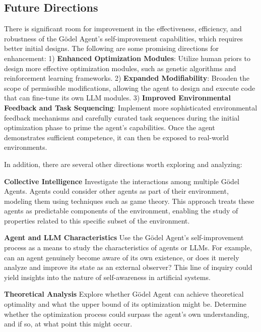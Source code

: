 \documentclass[11pt]{article}
\newcommand{\godel}{G\"odel\xspace}
\newcommand{\framework}{Gödel Agent\xspace}
\begin{document}
\subsection{Future Directions}




There is significant room for improvement in the effectiveness, efficiency, and robustness of the \framework{}'s self-improvement capabilities, which requires better initial designs. The following are some promising directions for enhancement:
1) \textbf{Enhanced Optimization Modules}: Utilize human priors to design more effective optimization modules, such as genetic algorithms and reinforcement learning frameworks.
2) \textbf{Expanded Modifiability}: Broaden the scope of permissible modifications, allowing the agent to design and execute code that can fine-tune its own LLM modules.
3) \textbf{Improved Environmental Feedback and Task Sequencing}: Implement more sophisticated environmental feedback mechanisms and carefully curated task sequences during the initial optimization phase to prime the agent's capabilities. Once the agent demonstrates sufficient competence, it can then be exposed to real-world environments.



In addition, there are several other directions worth exploring and analyzing:

\noindent\textbf{Collective Intelligence} \quad Investigate the interactions among multiple \godel Agents. Agents could consider other agents as part of their environment, modeling them using techniques such as game theory. This approach treats these agents as predictable components of the environment, enabling the study of properties related to this specific subset of the environment. 

\noindent\textbf{Agent and LLM Characteristics} \quad Use the \framework{}’s self-improvement process as a means to study the characteristics of agents or LLMs. For example, can an agent genuinely become aware of its own existence, or does it merely analyze and improve its state as an external observer? 
This line of inquiry could yield insights into the nature of self-awareness in artificial systems.

\noindent\textbf{Theoretical Analysis} \quad Explore whether \framework{} can achieve theoretical optimality and what the upper bound of its optimization might be. Determine whether the optimization process could surpass the agent’s own understanding, and if so, at what point this might occur.
\end{document}
